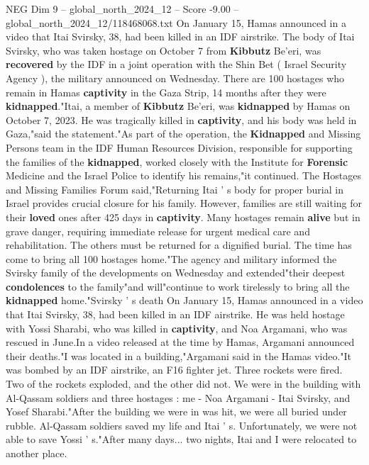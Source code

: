 \begin{textsample}{NEG Dim 9 – global\_north\_2024\_12 – Score -9.00 – global\_north\_2024\_12/118468068.txt}  \label{ex:f9_neg_115}
On January 15, Hamas announced in a video that Itai Svirsky, 38, had been killed in an IDF airstrike.
The body of Itai Svirsky, who was taken hostage on October 7 from \textbf{Kibbutz} Be'eri, was \textbf{recovered} by the IDF in a joint operation with the Shin Bet ( Israel Security Agency ), the military announced on Wednesday.
There are 100 hostages who remain in Hamas \textbf{captivity} in the Gaza Strip, 14 months after they were \textbf{kidnapped}."Itai, a member of \textbf{Kibbutz} Be'eri, was \textbf{kidnapped} by Hamas on October 7, 2023.
He was tragically killed in \textbf{captivity}, and his body was held in Gaza,"said the statement."As part of the operation, the \textbf{Kidnapped} and Missing Persons team in the IDF Human Resources Division, responsible for supporting the families of the \textbf{kidnapped}, worked closely with the Institute for \textbf{Forensic} Medicine and the Israel Police to identify his remains,"it continued.
The Hostages and Missing Families Forum said,"Returning Itai ' s body for proper burial in Israel provides crucial closure for his family.
However, families are still waiting for their \textbf{loved} ones after 425 days in \textbf{captivity}.
Many hostages remain \textbf{alive} but in grave danger, requiring immediate release for urgent medical care and rehabilitation.
The others must be returned for a dignified burial.
The time has come to bring all 100 hostages home."The agency and military informed the Svirsky family of the developments on Wednesday and extended"their deepest \textbf{condolences} to the family"and will"continue to work tirelessly to bring all the \textbf{kidnapped} home."Svirsky ' s death On January 15, Hamas announced in a video that Itai Svirsky, 38, had been killed in an IDF airstrike.
He was held hostage with Yossi Sharabi, who was killed in \textbf{captivity}, and Noa Argamani, who was rescued in June.In a video released at the time by Hamas, Argamani announced their deaths."I was located in a building,"Argamani said in the Hamas video."It was bombed by an IDF airstrike, an F16 fighter jet.
Three rockets were fired.
Two of the rockets exploded, and the other did not.
We were in the building with Al-Qassam soldiers and three hostages : me - Noa Argamani - Itai Svirsky, and Yosef Sharabi."After the building we were in was hit, we were all buried under rubble.
Al-Qassam soldiers saved my life and Itai ' s.
Unfortunately, we were not able to save Yossi ' s."After many days... two nights, Itai and I were relocated to another place.

\end{textsample}
